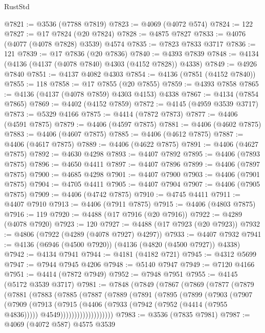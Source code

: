\begin{lexlean}{RustStd}
\begin{coremodule}
@7821 := @3536 (@7788 @7819)
@7823 := @4069 (@4072 @574)
@7824 := 122
@7827 := @17 @7824 (@20 @7824)
@7828 := @4875 @7827
@7833 := @4076 (@4077 (@4078 @7828) @3539) @4574
@7835 := @7823 @7833 @3717
@7836 := 121
@7839 := @17 @7836 (@20 @7836)
@7840 := @4393 @7839
@7848 := @4134 (@4136 (@4137 (@4078 @7840) @4303 (@4152 @7828)) @4338)
@7849 := @4926 @7840
@7851 := @4137 @4082 @4303
@7854 := @4136 (@7851 (@4152 @7840))
@7855 := 118
@7858 := @17 @7855 (@20 @7855)
@7859 := @4393 @7858
@7865 := @4136 (@4137 (@4078 @7859) @4303 @4153) @4338
@7867 := @4134 (@7854 @7865)
@7869 := @4402 (@4152 @7859)
@7872 := @4145 (@4959 @3539 @3717)
@7873 := @5329 @4166
@7875 := @4414 (@7872 @7873)
@7877 := @4406 (@4591 @7875)
@7879 := @4406 (@4597 @7875)
@7881 := @4406 (@4602 @7875)
@7883 := @4406 (@4607 @7875)
@7885 := @4406 (@4612 @7875)
@7887 := @4406 (@4617 @7875)
@7889 := @4406 (@4622 @7875)
@7891 := @4406 (@4627 @7875)
@7892 := @4630 @4298
@7893 := @4407 @7892
@7895 := @4406 (@7893 @7875)
@7896 := @4650 @4411
@7897 := @4407 @7896
@7899 := @4406 (@7897 @7875)
@7900 := @4685 @4298
@7901 := @4407 @7900
@7903 := @4406 (@7901 @7875)
@7904 := @4705 @4411
@7905 := @4407 @7904
@7907 := @4406 (@7905 @7875)
@7909 := @4406 (@4742 @7875)
@7910 := @4745 @4411
@7911 := @4407 @7910
@7913 := @4406 (@7911 @7875)
@7915 := @4406 (@4803 @7875)
@7916 := 119
@7920 := @4488 (@17 @7916 (@20 @7916))
@7922 := @4289 (@4078 @7920)
@7923 := 120
@7927 := @4488 (@17 @7923 (@20 @7923))
@7932 := @4806 (@7922 (@4289 (@4078 @7927) @4297))
@7933 := @4407 @7932
@7941 := @4136 (@6946 (@4500 @7920)) (@4136 (@4820 (@4500 @7927)) @4338)
@7942 := @4134 @7941
@7944 := @4181 (@4182 @721)
@7945 := @4312 @5699
@7947 := @7944 @7945 @4206
@7948 := @5140 @7947
@7949 := @7120 @4166
@7951 := @4414 (@7872 @7949)
@7952 := @7948 @7951
@7955 := @4145 (@5172 @3539 @3717)
@7981 := @7848
    (@7849
      (@7867
        (@7869
          (@7877
            (@7879
              (@7881
                (@7883
                  (@7885
                    (@7887
                      (@7889
                        (@7891
                          (@7895
                            (@7899
                              (@7903
                                (@7907
                                  (@7909
                                    (@7913
                                      (@7915
                                        (@4406
                                          (@7933 (@7942 (@7952 (@4414 (@7955 @4836)))))
                                          @4549)))))))))))))))))))
@7983 := @3536 (@7835 @7981)
@7987 := @4069 (@4072 @587) @4575 @3539

\end{coremodule}
\end{lexlean}
